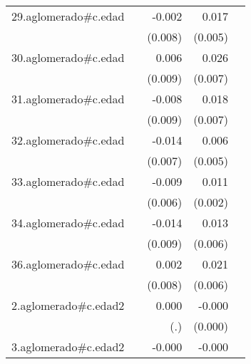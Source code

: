 {\begin{longtable}{l*{4}{D{.}{.}{-1}}}
\addlinespace
29.aglomerado#c.edad&                     &      -0.002         &       0.017\sym{**} &                     \\
            &                     &     (0.008)         &     (0.005)         &                     \\
\addlinespace
30.aglomerado#c.edad&                     &       0.006         &       0.026\sym{***}&                     \\
            &                     &     (0.009)         &     (0.007)         &                     \\
\addlinespace
31.aglomerado#c.edad&                     &      -0.008         &       0.018\sym{**} &                     \\
            &                     &     (0.009)         &     (0.007)         &                     \\
\addlinespace
32.aglomerado#c.edad&                     &      -0.014         &       0.006         &                     \\
            &                     &     (0.007)         &     (0.005)         &                     \\
\addlinespace
33.aglomerado#c.edad&                     &      -0.009         &       0.011\sym{***}&                     \\
            &                     &     (0.006)         &     (0.002)         &                     \\
\addlinespace
34.aglomerado#c.edad&                     &      -0.014         &       0.013\sym{*}  &                     \\
            &                     &     (0.009)         &     (0.006)         &                     \\
\addlinespace
36.aglomerado#c.edad&                     &       0.002         &       0.021\sym{***}&                     \\
            &                     &     (0.008)         &     (0.006)         &                     \\
\addlinespace
2.aglomerado#c.edad2&                     &       0.000         &      -0.000         &                     \\
            &                     &         (.)         &     (0.000)         &                     \\
\addlinespace
3.aglomerado#c.edad2&                     &      -0.000         &      -0.000\sym{*}  &                     \\

\end{longtable}}
